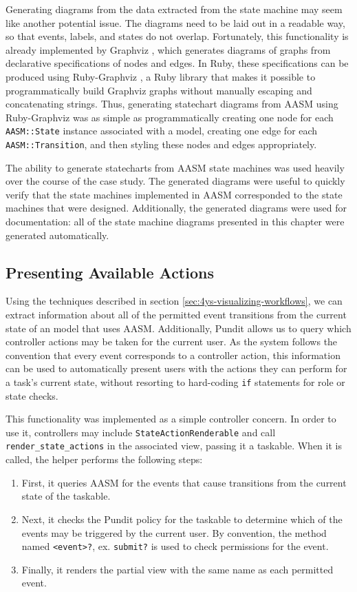 \documentclass[document.tex]{subfiles}
\begin{document}
Generating diagrams from the data extracted from the state machine may seem like another potential issue. The diagrams need to be laid out in a readable way, so that events, labels, and states do not overlap. Fortunately, this functionality is already implemented by Graphviz \cite{graphviz}, which generates diagrams of graphs from declarative specifications of nodes and edges.
In Ruby, these specifications can be produced using Ruby-Graphviz \cite{ruby-graphviz}, a Ruby library that makes it possible to programmatically build Graphviz graphs without manually escaping and concatenating strings. Thus, generating statechart diagrams from AASM using Ruby-Graphviz was as simple as programmatically creating one node for each \verb!AASM::State! instance associated with a model, creating one edge for each \verb!AASM::Transition!, and then styling these nodes and edges appropriately.

The ability to generate statecharts from AASM state machines was used heavily over the course of the case study. The generated diagrams were useful to quickly verify that the state machines implemented in AASM corresponded to the state machines that were designed. Additionally, the generated diagrams were used for documentation: all of the state machine diagrams presented in this chapter were generated automatically.


\FloatBarrier

\subsection {Presenting Available Actions}
\label {sec:4ys-available-actions}

Using the techniques described in section \ref{sec:4ys-visualizing-workflows},
we can extract information about all of the permitted event transitions from the current state of an model that uses AASM. Additionally, Pundit allows us to query which controller actions may be taken for the current user. As the system follows the convention that every event corresponds to a controller action, this information can be used to automatically present users with the actions they can perform for a task's current state, without resorting to hard-coding \verb!if! statements for role or state checks.

This functionality was implemented as a simple controller concern. In order to use it, controllers may include \verb!StateActionRenderable! and call 
\verb!render_state_actions! in the associated view, passing it a taskable. When it is called, the helper performs the following steps:
\begin{enumerate}
\item First, it queries AASM for the events that cause transitions from the current state of the taskable.
\item Next, it checks the Pundit policy for the taskable to determine which of the events may be triggered by the current user. By convention, the method named \verb!<event>?!, ex. \verb!submit?! is used to check permissions for the event.
\item Finally, it renders the partial view with the same name as each permitted event.
\end{enumerate}
\end{document}
